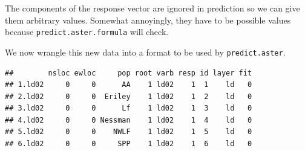 \documentclass[
  ignorenonframetext,
]{beamer}
\newenvironment{Shaded}{\begin{snugshade}}{\end{snugshade}}
\newcommand{\AttributeTok}[1]{\textcolor[rgb]{0.77,0.63,0.00}{#1}}
\newcommand{\FunctionTok}[1]{\textcolor[rgb]{0.00,0.00,0.00}{#1}}
\newcommand{\NormalTok}[1]{#1}
\newcommand{\OtherTok}[1]{\textcolor[rgb]{0.56,0.35,0.01}{#1}}
\newcommand{\SpecialCharTok}[1]{\textcolor[rgb]{0.00,0.00,0.00}{#1}}
\newcommand{\StringTok}[1]{\textcolor[rgb]{0.31,0.60,0.02}{#1}}
\begin{document}
\begin{frame}[fragile]{}
\protect\hypertarget{section-31}{}
The components of the response vector are ignored in prediction so we
can give them arbitrary values. Somewhat annoyingly, they have to be
possible values because \texttt{predict.aster.formula} will check.

We now wrangle this new data into a format to be used by
\texttt{predict.aster}.

\tiny
\vspace{12pt}

\begin{Shaded}
\end{Shaded}

\begin{verbatim}
##        nsloc ewloc     pop root varb resp id layer fit
## 1.ld02     0     0      AA    1 ld02    1  1    ld   0
## 2.ld02     0     0  Eriley    1 ld02    1  2    ld   0
## 3.ld02     0     0      Lf    1 ld02    1  3    ld   0
## 4.ld02     0     0 Nessman    1 ld02    1  4    ld   0
## 5.ld02     0     0    NWLF    1 ld02    1  5    ld   0
## 6.ld02     0     0     SPP    1 ld02    1  6    ld   0
\end{verbatim}
\end{frame}
\end{document}
